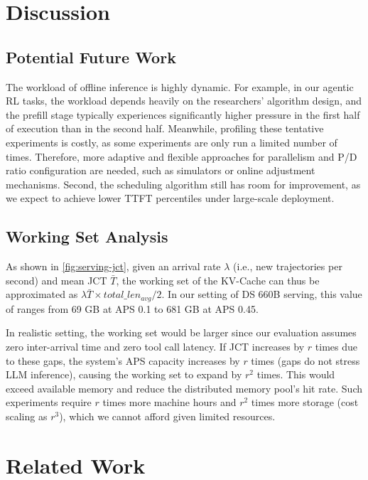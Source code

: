 \section{Discussion}
\label{sec:discussion}


\subsection{Potential Future Work}
\label{subsec:futurework}

The workload of offline inference is highly dynamic. For example, in our agentic RL tasks, the workload depends heavily on the researchers' algorithm design, and the prefill stage typically experiences significantly higher pressure in the first half of execution than in the second half. Meanwhile, profiling these tentative experiments is costly, as some experiments are only run a limited number of times. Therefore, more adaptive and flexible approaches for parallelism and P/D ratio configuration are needed, such as simulators or online adjustment mechanisms. Second, the scheduling algorithm still has room for improvement, as we expect to achieve lower TTFT percentiles under large-scale deployment.

\subsection{Working Set Analysis}

As shown in \autoref{fig:serving-jct}, given an arrival rate $\lambda$ (i.e., new trajectories per second) and mean JCT $\bar{T}$, the working set of the KV-Cache can thus be approximated as $\lambda \bar{T} \times total\_len_{avg}/2$.
In our setting of DS 660B serving, this value of \sysname ranges from 69 GB at APS 0.1 to 681 GB at APS 0.45.

In realistic setting, the working set would be larger since our evaluation assumes zero inter-arrival time and zero tool call latency. 
If JCT increases by $r$ times due to these gaps, the system's APS capacity increases by $r$ times (gaps do not stress LLM inference), causing the working set to expand by $r^2$ times.
This would exceed available memory and reduce the distributed memory pool's hit rate.
Such experiments require $r$ times more machine hours and $r^2$ times more storage (cost scaling as $r^3$), which we cannot afford given limited resources.


\section{Related Work}

